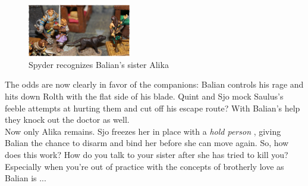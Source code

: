 \begin{figure}[h]
	\centering
	\includegraphics[width=0.4\textwidth]{images/Spyder-recognizes-Balian-s-sister-Alika-520054718_mod.jpg}
	\caption{Spyder recognizes Balian's sister Alika}
	\label{fig:Spyder-recognizes-Balian-s-sister-Alika-520054718}
\end{figure}

The odds are now clearly in favor of the companions: Balian controls his rage and hits down Rolth with the flat side of his blade. Quint and Sjo mock Saulus's feeble attempts at hurting them and cut off his escape route? With Balian's help they knock out the doctor as well.\\

Now only Alika remains. Sjo freezes her in place with a {\itshape hold person} , giving Balian the chance to disarm and bind her before she can move again. So, how does this work? How do you talk to your sister after she has tried to kill you? Especially when you're out of practice with the concepts of brotherly love as Balian is ... 